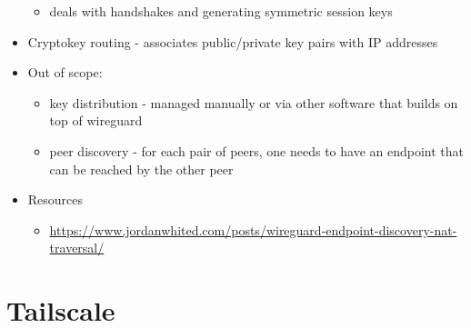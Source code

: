 \begin{itemize}
  \begin{itemize}
  \tightlist
  \item
    deals with handshakes and generating symmetric session keys
  \end{itemize}
\item
  Cryptokey routing - associates public/private key pairs with IP
  addresses
\item
  Out of scope:

  \begin{itemize}
  \tightlist
  \item
    key distribution - managed manually or via other software that
    builds on top of wireguard
  \item
    peer discovery - for each pair of peers, one needs to have an
    endpoint that can be reached by the other peer
  \end{itemize}
\item
  Resources

  \begin{itemize}
  \tightlist
  \item
    \url{https://www.jordanwhited.com/posts/wireguard-endpoint-discovery-nat-traversal/}
  \end{itemize}
\end{itemize}

\hypertarget{tailscale}{%
\section{Tailscale}\label{tailscale}}

